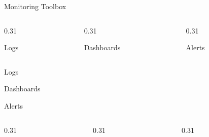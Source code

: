 \begin{frame}{Monitoring Toolbox}
  \begin{columns}[T,onlytextwidth]
    \begin{column}{0.31\textwidth}
      \begin{tdblockt}[equal height group=tool]{Logs}
      \end{tdblockt}
    \end{column}
    \begin{column}{0.31\textwidth}
      \begin{tdblockt}[equal height group=tool]{Dashboards}
      \end{tdblockt}
    \end{column}
    \begin{column}{0.31\textwidth}
      \begin{tdblockt}[equal height group=tool]{Alerts}
      \end{tdblockt}
    \end{column}
  \end{columns}
\end{frame}

\begin{frame}{Logs}
  \begin{tdcode}
  \end{tdcode}
\end{frame}

\begin{frame}{Dashboards}
  \begin{withmargin}
    \begin{tdmain}
    \end{tdmain}
    \begin{tdmargin}
    \end{tdmargin}
  \end{withmargin}
\end{frame}

\begin{frame}{Alerts}
  \begin{columns}[T,onlytextwidth]
    \begin{column}{0.31\textwidth}
      \begin{tdblock}[equal height group=alert]
      \end{tdblock}
    \end{column}
    \begin{column}{0.31\textwidth}
      \begin{tdblock}[equal height group=alert]
      \end{tdblock}
    \end{column}
    \begin{column}{0.31\textwidth}
      \begin{tdblock}[equal height group=alert]
      \end{tdblock}
    \end{column}
  \end{columns}
\end{frame}

